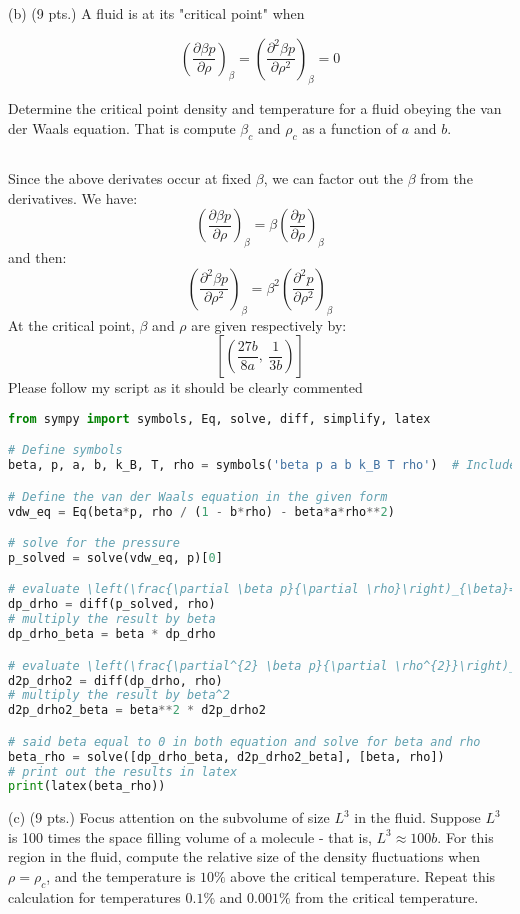 \documentclass[12pt]{article}
\begin{document}
(b) (9 pts.) A fluid is at its "critical point" when

$$
\left(\frac{\partial \beta p}{\partial \rho}\right)_{\beta}=\left(\frac{\partial^{2} \beta p}{\partial \rho^{2}}\right)_{\beta}=0
$$

Determine the critical point density and temperature for a fluid obeying the van der Waals equation. That is compute $\beta_{c}$ and $\rho_{c}$ as a function of $a$ and $b$.
\subsection{}
Since the above derivates occur at fixed $\beta$, we can factor out the $\beta$ from the derivatives. We have:
\begin{equation}
  \left(\frac{\partial \beta p}{\partial \rho}\right)_{\beta}=\beta \left(\frac{\partial p}{\partial \rho}\right)_{\beta}
\end{equation}
and then:
\begin{equation}
  \left(\frac{\partial^{2} \beta p}{\partial \rho^{2}}\right)_{\beta}=\beta^2 \left(\frac{\partial^2 p}{\partial \rho^2}\right)_{\beta}
\end{equation}
At the critical point, $\beta $ and $\rho$ are given respectively by:
\begin{equation}
  \left[ \left( \frac{27 b}{8 a}, \  \frac{1}{3 b}\right)\right]
\end{equation}
Please follow my script as it should be clearly commented
\begin{lstlisting}[language=Python]
from sympy import symbols, Eq, solve, diff, simplify, latex

# Define symbols
beta, p, a, b, k_B, T, rho = symbols('beta p a b k_B T rho')  # Include rho in the symbols

# Define the van der Waals equation in the given form
vdw_eq = Eq(beta*p, rho / (1 - b*rho) - beta*a*rho**2)

# solve for the pressure
p_solved = solve(vdw_eq, p)[0]

# evaluate \left(\frac{\partial \beta p}{\partial \rho}\right)_{\beta}=\beta \left(\frac{\partial p}{\partial \rho}\right)_{\beta}
dp_drho = diff(p_solved, rho)
# multiply the result by beta
dp_drho_beta = beta * dp_drho

# evaluate \left(\frac{\partial^{2} \beta p}{\partial \rho^{2}}\right)_{\beta}=\beta^2 \left(\frac{\partial^2 p}{\partial \rho^2}\right)_{\beta}
d2p_drho2 = diff(dp_drho, rho)
# multiply the result by beta^2
d2p_drho2_beta = beta**2 * d2p_drho2

# said beta equal to 0 in both equation and solve for beta and rho
beta_rho = solve([dp_drho_beta, d2p_drho2_beta], [beta, rho])
# print out the results in latex
print(latex(beta_rho))
\end{lstlisting}
(c) (9 pts.) Focus attention on the subvolume of size $L^{3}$ in the fluid. Suppose $L^{3}$ is 100 times the space filling volume of a molecule - that is, $L^{3} \approx 100 b$. For this region in the fluid, compute the relative size of the density fluctuations when $\rho=\rho_{c}$, and the temperature is $10 \%$ above the critical temperature. Repeat this calculation for temperatures $0.1 \%$ and $0.001 \%$ from the critical temperature.
\end{document}
